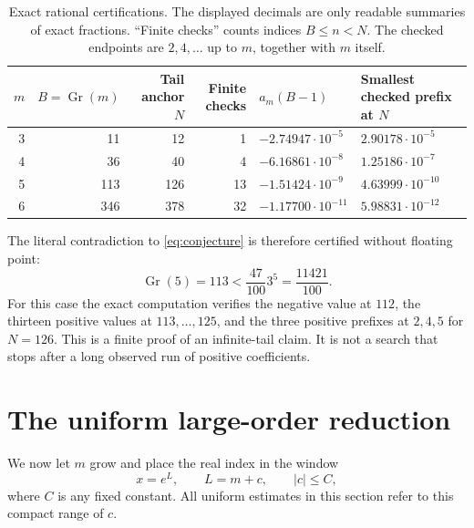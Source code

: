 \documentclass[11pt]{article}
\numberwithin{equation}{section}
\theoremstyle{definition}
\newcommand{\Gr}{\operatorname{Gr}}
\begin{document}
\begin{table}[htbp]\centering\small
\begin{tabular}{@{}rrrrll@{}}
\toprule
$m$ & $B=\Gr(m)$ & Tail anchor $N$ & Finite checks & $a_m(B-1)$ &
 Smallest checked prefix at $N$\\
\midrule
3 & 11 & 12 & 1 & $-2.74947\cdot10^{-5}$ & $2.90178\cdot10^{-5}$\\
4 & 36 & 40 & 4 & $-6.16861\cdot10^{-8}$ & $1.25186\cdot10^{-7}$\\
5 & 113 & 126 & 13 & $-1.51424\cdot10^{-9}$ & $4.63999\cdot10^{-10}$\\
6 & 346 & 378 & 32 & $-1.17700\cdot10^{-11}$ & $5.98831\cdot10^{-12}$\\
\bottomrule
\end{tabular}
\caption{Exact rational certifications. The displayed decimals are only
readable summaries of exact fractions. ``Finite checks'' counts indices
$B\le n<N$. The checked endpoints are $2,4,\ldots$ up to $m$, together
with $m$ itself.}\label{tab:cert}
\end{table}

The literal contradiction to \eqref{eq:conjecture} is therefore certified
without floating point:
\begin{equation}\label{eq:finitecounter}
 \Gr(5)=113<\frac{47}{100}3^5=\frac{11421}{100}.
\end{equation}
For this case the exact computation verifies the negative value at $112$,
the thirteen positive values at $113,\ldots,125$, and the three positive
prefixes at $2,4,5$ for $N=126$. This is a finite proof of an infinite-tail
claim. It is not a search that stops after a long observed run of positive
coefficients.

\section{The uniform large-order reduction}\label{sec:uniform}

We now let $m$ grow and place the real index in the window
\begin{equation}\label{eq:window}
 x=e^L,\qquad L=m+c,\qquad |c|\le C,
\end{equation}
where $C$ is any fixed constant. All uniform estimates in this section
refer to this compact range of $c$.
\end{document}
